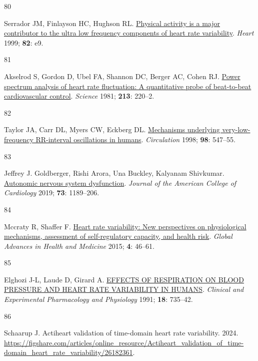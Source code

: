 \documentclass[
  a4paper,
  headsepline=true,
  open=left]{scrbook}
\newlength{\cslhangindent}
\newlength{\csllabelwidth}
\newlength{\cslentryspacingunit} %
\newenvironment{CSLReferences}[2] %
 {%
  \setlength{\parindent}{0pt}
  \ifodd #1
  \let\oldpar\par
  \def\par{\hangindent=\cslhangindent\oldpar}
  \fi
  \setlength{\parskip}{#2\cslentryspacingunit}
 }%
 {}
\newcommand{\CSLLeftMargin}[1]{\parbox[t]{\csllabelwidth}{#1}}
\newcommand{\CSLRightInline}[1]{\parbox[t]{\linewidth - \csllabelwidth}{#1}\break}
\begin{document}
\begin{CSLReferences}{0}{0}
\leavevmode{}%
\CSLLeftMargin{80 }%
\CSLRightInline{Serrador JM, Finlayson HC, Hughson RL.
\href{https://doi.org/10.1136/hrt.82.6.e9}{Physical activity is a major
contributor to the ultra low frequency components of heart rate
variability}. \emph{Heart} 1999; \textbf{82}: e9.}

\leavevmode{}%
\CSLLeftMargin{81 }%
\CSLRightInline{Akselrod S, Gordon D, Ubel FA, Shannon DC, Berger AC,
Cohen RJ. \href{https://doi.org/10.1126/science.6166045}{Power spectrum
analysis of heart rate fluctuation: A quantitative probe of beat-to-beat
cardiovascular control}. \emph{Science} 1981; \textbf{213}: 220--2.}

\leavevmode{}%
\CSLLeftMargin{82 }%
\CSLRightInline{Taylor JA, Carr DL, Myers CW, Eckberg DL.
\href{https://doi.org/10.1161/01.CIR.98.6.547}{Mechanisms underlying
very-low-frequency RR-interval oscillations in humans}.
\emph{Circulation} 1998; \textbf{98}: 547--55.}

\leavevmode{}%
\CSLLeftMargin{83 }%
\CSLRightInline{Jeffrey J. Goldberger, Rishi Arora, Una Buckley,
Kalyanam Shivkumar.
\href{https://doi.org/doi:10.1016/j.jacc.2018.12.064}{Autonomic nervous
system dysfunction}. \emph{Journal of the American College of
Cardiology} 2019; \textbf{73}: 1189--206.}

\leavevmode{}%
\CSLLeftMargin{84 }%
\CSLRightInline{Mccraty R, Shaffer F.
\href{https://doi.org/10.7453/gahmj.2014.073}{Heart rate variability:
New perspectives on physiological mechanisms, assessment of
self-regulatory capacity, and health risk}. \emph{Global Advances in
Health and Medicine} 2015; \textbf{4}: 46--61.}

\leavevmode{}%
\CSLLeftMargin{85 }%
\CSLRightInline{Elghozi J-L, Laude D, Girard A.
\href{https://doi.org/10.1111/j.1440-1681.1991.tb01391.x}{EFFECTS OF
RESPIRATION ON BLOOD PRESSURE AND HEART RATE VARIABILITY IN HUMANS}.
\emph{Clinical and Experimental Pharmacology and Physiology} 1991;
\textbf{18}: 735--42.}

\leavevmode{}%
\CSLLeftMargin{86 }%
\CSLRightInline{Schaarup J. Actiheart validation of time-domain heart
rate variability. 2024.
\url{https://figshare.com/articles/online_resource/Actiheart_validation_of_time-domain_heart_rate_variability/26182361}.}


\end{CSLReferences}
\end{document}
